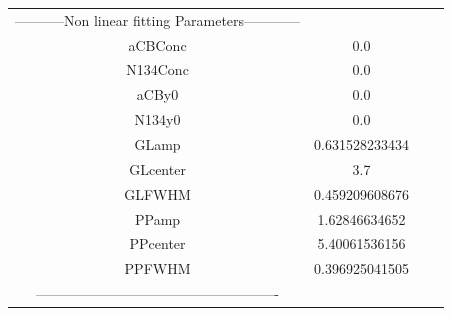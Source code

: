 \documentclass{article}
\begin{document}
\begin{tabular}{c c c c}

-----------Non linear fitting Parameters------------\\
aCBConc    &0.0\\
N134Conc   &0.0\\
aCBy0      &0.0\\
N134y0     &0.0\\
GLamp      &0.631528233434\\
GLcenter   &3.7\\
GLFWHM     &0.459209608676\\
PPamp      &1.62846634652\\
PPcenter   &5.40061536156\\
PPFWHM     &0.396925041505\\
----------------------------------------------------\\


\end{tabular}
\end{document}

